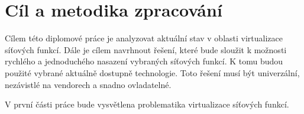 \chapter{Cíl a metodika zpracování}

Cílem této diplomové práce je analyzovat aktuální stav v oblasti virtualizace síťových funkcí. Dále je cílem navrhnout řešení, které bude sloužit k možnosti rychlého a jednoduchého nasazení vybraných síťových funkcí. K tomu budou použité vybrané aktuálně dostupně technologie. Toto řešení musí být univerzální, nezávistlé na vendorech a snadno ovladatelné.

V první části práce bude vysvětlena problematika virtualizace síťových funkcí.





